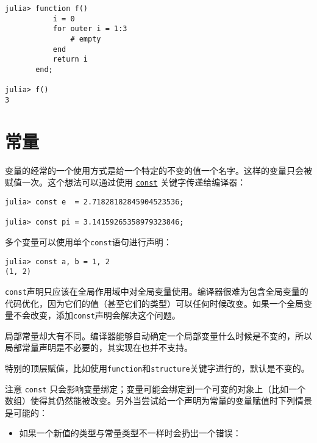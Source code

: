 \begin{verbatim}
julia> function f()
           i = 0
           for outer i = 1:3
               # empty
           end
           return i
       end;

julia> f()
3
\end{verbatim}



\hypertarget{5407065244463689569}{}


\section{常量}



变量的经常的一个使用方式是给一个特定的不变的值一个名字。这样的变量只会被赋值一次。这个想法可以通过使用 \hyperlink{8421885763632484758}{\texttt{const}} 关键字传递给编译器：




\begin{verbatim}
julia> const e  = 2.71828182845904523536;

julia> const pi = 3.14159265358979323846;
\end{verbatim}



多个变量可以使用单个\texttt{const}语句进行声明：




\begin{verbatim}
julia> const a, b = 1, 2
(1, 2)
\end{verbatim}



\texttt{const}声明只应该在全局作用域中对全局变量使用。编译器很难为包含全局变量的代码优化，因为它们的值（甚至它们的类型）可以任何时候改变。如果一个全局变量不会改变，添加\texttt{const}声明会解决这个问题。



局部常量却大有不同。编译器能够自动确定一个局部变量什么时候是不变的，所以局部常量声明是不必要的，其实现在也并不支持。



特别的顶层赋值，比如使用\texttt{function}和\texttt{structure}关键字进行的，默认是不变的。



注意 \texttt{const} 只会影响变量绑定；变量可能会绑定到一个可变的对象上（比如一个数组）使得其仍然能被改变。另外当尝试给一个声明为常量的变量赋值时下列情景是可能的：



\begin{itemize}
\item 如果一个新值的类型与常量类型不一样时会扔出一个错误：

\end{itemize}



